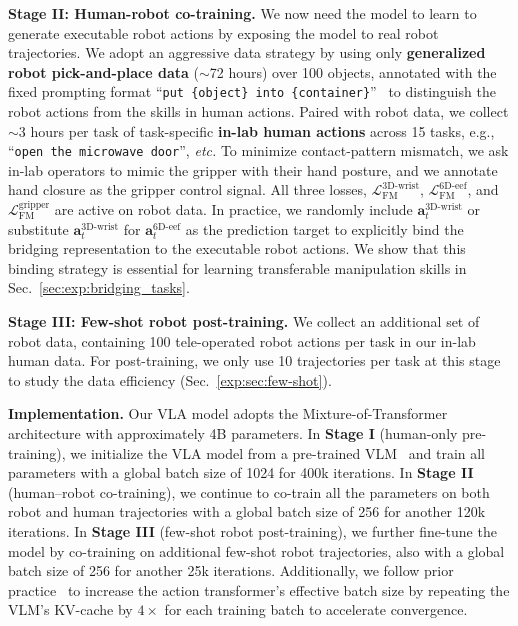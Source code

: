 \documentclass{llmxive}
\providecommand{\myparagraph}[1]{\vspace{0.1em}\noindent\textbf{#1}}
\begin{document}
\myparagraph{Stage II: Human-robot co-training.}
% 
We now need the model to learn to generate executable robot actions by exposing the model to real robot trajectories.
% 
We adopt an aggressive data strategy by using only \textbf{generalized robot pick-and-place data} ($\sim$72 hours) over 100 objects, annotated with the fixed prompting format ``\texttt{put \{object\} into \{container\}}''~\cite{cheang2025gr3} to distinguish the robot actions from the skills in human actions.
% 
Paired with robot data, we collect $\sim$3 hours per task of task-specific \textbf{in-lab human actions} across 15 tasks, e.g., ``\texttt{open the microwave door}'', \textit{etc.}
% 
To minimize contact-pattern mismatch, we ask in-lab operators to mimic the gripper with their hand posture, and we annotate hand closure as the gripper control signal.
% 
All three losses, $\mathcal{L}_{\text{FM}}^{\text{3D-wrist}}$, $\mathcal{L}_{\text{FM}}^{\text{6D-eef}}$, and $\mathcal{L}_{\text{FM}}^{\text{gripper}}$ are active on robot data.
% 
In practice, we randomly include $\mathbf{a}_t^{\text{3D-wrist}}$ or substitute $\mathbf{a}_t^{\text{3D-wrist}}$ for $\mathbf{a}_t^{\text{6D-eef}}$ as the prediction target to explicitly bind the bridging representation to the executable robot actions. 
% 
We show that this binding strategy is essential for learning transferable manipulation skills in Sec.~\ref{sec:exp:bridging_tasks}.





\myparagraph{Stage III: Few-shot robot post-training.}
%
We collect an additional set of robot data, containing 100 tele-operated robot actions per task in our in-lab human data.
% 
For post-training, we only use 10 trajectories per task at this stage to study the data efficiency (Sec.~\ref{exp:sec:few-shot}).



\myparagraph{Implementation.}
%
Our VLA model adopts the Mixture-of-Transformer~\cite{liang2024mixture,black2024pi_0} architecture with approximately 4B parameters.
% 
In \textbf{Stage I} (human-only pre-training), we initialize the VLA model from a pre-trained VLM~\cite{bai2025qwen25vltechnicalreport} and train all parameters with a global batch size of 1024 for 400k iterations.
% 
In \textbf{Stage II} (human--robot co-training), we continue to co-train all the parameters on both robot and human trajectories with a global batch size of 256 for another 120k iterations.
% 
In \textbf{Stage III} (few-shot robot post-training), we further fine-tune the model by co-training on additional few-shot robot trajectories, also with a global batch size of 256 for another 25k iterations.
% 
Additionally, we follow prior practice~\cite{li2024autoregressive,cheang2025gr3} to increase the action transformer's effective batch size by repeating the VLM's KV-cache by $4\times$ for each training batch to accelerate convergence.
\end{document}
